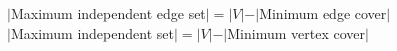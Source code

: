 $|$Maximum independent edge set$|=|V|-|$Minimum edge cover$|$\\
$|$Maximum independent set$|=|V|-|$Minimum vertex cover$|$\\